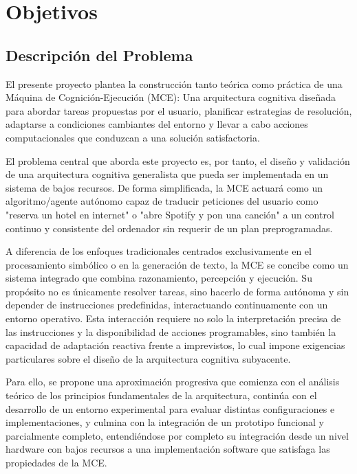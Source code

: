 \chapter{Objetivos}
\section{Descripción del Problema}

El presente proyecto plantea la construcción tanto teórica como práctica de una
Máquina de Cognición-Ejecución (MCE): Una arquitectura cognitiva diseñada para
abordar tareas propuestas por el usuario, planificar estrategias de resolución,
adaptarse a condiciones cambiantes del entorno y llevar a cabo acciones
computacionales que conduzcan a una solución satisfactoria.

El problema central que aborda este proyecto es, por tanto, el diseño y
validación de una arquitectura cognitiva generalista que pueda ser implementada
en un sistema de bajos recursos. De forma simplificada, la MCE
actuará como un algoritmo/agente autónomo capaz de traducir peticiones del 
usuario como "reserva un hotel en internet" o "abre Spotify y pon una canción" a 
un control continuo y consistente del ordenador sin requerir de un plan preprogramadas.

A diferencia de los enfoques tradicionales centrados exclusivamente en el
procesamiento simbólico o en la generación de texto, la MCE se concibe como un
sistema integrado que combina razonamiento, percepción y ejecución. Su propósito
no es únicamente resolver tareas, sino hacerlo de forma autónoma y sin depender
de instrucciones predefinidas, interactuando continuamente con un entorno 
operativo. Esta interacción requiere no solo la interpretación precisa 
de las instrucciones y la disponibilidad de acciones
programables, sino también la capacidad de adaptación reactiva frente a
imprevistos, lo cual impone exigencias particulares sobre el diseño de la
arquitectura cognitiva subyacente.

Para ello, se propone una aproximación progresiva que comienza con el análisis 
teórico de los principios fundamentales de la arquitectura, continúa con el 
desarrollo de un entorno experimental para evaluar distintas configuraciones e implementaciones, y
culmina con la integración de un prototipo funcional y parcialmente completo, 
entendiéndose por completo su integración desde un nivel hardware con bajos recursos
a una implementación software que satisfaga las propiedades de la MCE. 

